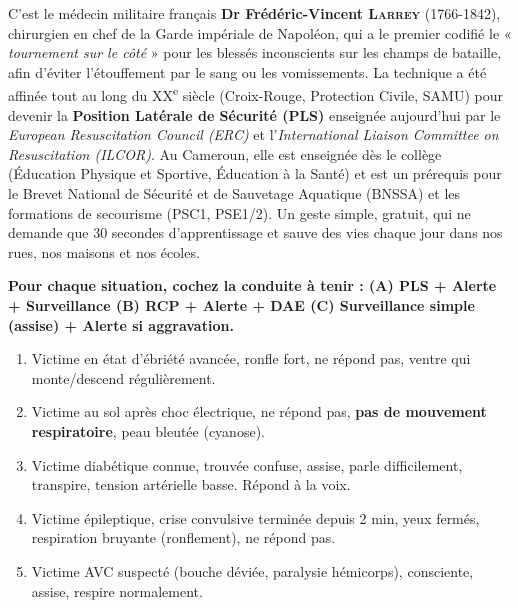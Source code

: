 \documentclass[11pt]{article}
\begin{document}
\begin{savaistu}
C'est le médecin militaire français \textbf{Dr Frédéric-Vincent \textsc{Larrey}} (1766-1842), chirurgien en chef de la Garde impériale de Napoléon, qui a le premier codifié le « \emph{tournement sur le côté} » pour les blessés inconscients sur les champs de bataille, afin d'éviter l'étouffement par le sang ou les vomissements. La technique a été affinée tout au long du XX\textsuperscript{e} siècle (Croix-Rouge, Protection Civile, SAMU) pour devenir la \textbf{Position Latérale de Sécurité (PLS)} enseignée aujourd'hui par le \emph{European Resuscitation Council (ERC)} et l'\emph{International Liaison Committee on Resuscitation (ILCOR)}. Au Cameroun, elle est enseignée dès le collège (Éducation Physique et Sportive, Éducation à la Santé) et est un prérequis pour le Brevet National de Sécurité et de Sauvetage Aquatique (BNSSA) et les formations de secourisme (PSC1, PSE1/2). Un geste simple, gratuit, qui ne demande que 30 secondes d'apprentissage et sauve des vies chaque jour dans nos rues, nos maisons et nos écoles.
\end{savaistu}

\begin{exercice}
\textbf{Pour chaque situation, cochez la conduite à tenir : (A) PLS + Alerte + Surveillance \quad (B) RCP + Alerte + DAE \quad (C) Surveillance simple (assise) + Alerte si aggravation.}
\begin{enumerate}
    \item Victime en état d'ébriété avancée, ronfle fort, ne répond pas, ventre qui monte/descend régulièrement.
    \item Victime au sol après choc électrique, ne répond pas, \textbf{pas de mouvement respiratoire}, peau bleutée (cyanose).
    \item Victime diabétique connue, trouvée confuse, assise, parle difficilement, transpire, tension artérielle basse. Répond à la voix.
    \item Victime épileptique, crise convulsive terminée depuis 2 min, yeux fermés, respiration bruyante (ronflement), ne répond pas.
    \item Victime AVC suspecté (bouche déviée, paralysie hémicorps), consciente, assise, respire normalement.
\end{enumerate}
\end{exercice}
\end{document}
